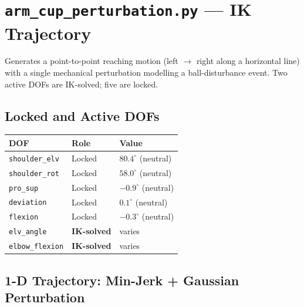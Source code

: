 \documentclass[11pt,a4paper]{article}
\newcommand{\dof}[1]{\texttt{\small #1}}
\begin{document}
\section{\texttt{arm\_cup\_perturbation.py} — IK Trajectory}

Generates a point-to-point reaching motion (left $\to$ right along a
horizontal line) with a single mechanical perturbation modelling a
ball-disturbance event.  Two active DOFs are IK-solved; five are locked.

\subsection{Locked and Active DOFs}

\begin{tabular}{lll}
\toprule
\textbf{DOF} & \textbf{Role} & \textbf{Value} \\
\midrule
\rowcolor{gray!6}\dof{shoulder\_elv} & Locked & $80.4^\circ$ (neutral) \\
\dof{shoulder\_rot} & Locked & $58.0^\circ$ (neutral) \\
\rowcolor{gray!6}\dof{pro\_sup}      & Locked & $-0.9^\circ$ (neutral) \\
\dof{deviation}     & Locked & $0.1^\circ$ (neutral) \\
\rowcolor{gray!6}\dof{flexion}       & Locked & $-0.3^\circ$ (neutral) \\
\midrule
\dof{elv\_angle}     & \textbf{IK-solved} & varies \\
\rowcolor{gray!6}\dof{elbow\_flexion} & \textbf{IK-solved} & varies \\
\bottomrule
\end{tabular}

\subsection{1-D Trajectory: Min-Jerk + Gaussian Perturbation}
\end{document}
